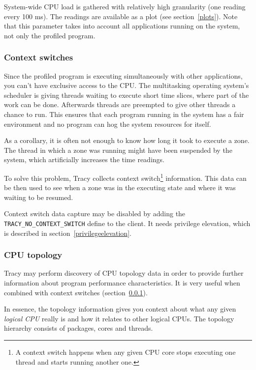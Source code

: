 \documentclass[hidelinks,titlepage,a4paper]{article}
\begin{document}
System-wide CPU load is gathered with relatively high granularity (one reading every 100 \si{\milli\second}). The readings are available as a plot (see section~\ref{plots}). Note that this parameter takes into account all applications running on the system, not only the profiled program.

\subsubsection{Context switches}
\label{contextswitches}

Since the profiled program is executing simultaneously with other applications, you can't have exclusive access to the CPU. The multitasking operating system's scheduler is giving threads waiting to execute short time slices, where part of the work can be done. Afterwards threads are preempted to give other threads a chance to run. This ensures that each program running in the system has a fair environment and no program can hog the system resources for itself.

As a corollary, it is often not enough to know how long it took to execute a zone. The thread in which a zone was running might have been suspended by the system, which artificially increases the time readings.

To solve this problem, Tracy collects context switch\footnote{A context switch happens when any given CPU core stops executing one thread and starts running another one.} information. This data can be then used to see when a zone was in the executing state and where it was waiting to be resumed.

Context switch data capture may be disabled by adding the \texttt{TRACY\_NO\_CONTEXT\_SWITCH} define to the client. It needs privilege elevation, which is described in section~\ref{privilegeelevation}.

\subsubsection{CPU topology}
\label{cputopology}

Tracy may perform discovery of CPU topology data in order to provide further information about program performance characteristics. It is very useful when combined with context switches (section~\ref{contextswitches}).

In essence, the topology information gives you context about what any given \emph{logical CPU} really is and how it relates to other logical CPUs. The topology hierarchy consists of packages, cores and threads.
\end{document}
